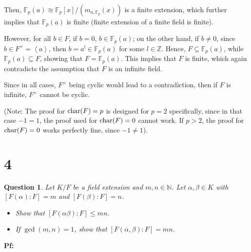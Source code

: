 \documentclass{article}
\newtheorem{question}{Question}
\begin{document}
Then, $\mathbb{F}_p(a) \cong \mathbb{F}_p[x]/(m_{a,\mathbb{F}_p}(x))$ is a finite extension, which further implies that $\mathbb{F}_p(a)$ is finite (finite extension of a finite field is finite).

However, for all $b\in F$, if $b=0$, $b\in\mathbb{F}_p(a)$; on the other hand, if $b\neq 0$, since $b\in F^\times = \left<a\right>$, then $b=a^l\in\mathbb{F}_p(a)$ for some $l\in\mathbb{Z}$. Hence, $F\subseteq\mathbb{F}_p(a)$, while $\mathbb{F}_p(a)\subseteq F$, showing that $F=\mathbb{F}_p(a)$. This implies that $F$ is finite, which again contradicts the assumption that $F$ is an infinite field.

\hfil

Since in all cases, $F^\times$ being cyclic would lead to a contradiction, then if $F$ is infinite, $F^\times$ cannot be cyclic.

(Note: The proof for $\textmd{char}(F)=p$ is designed for $p=2$ specifically, since in that case $-1=1$, the proof used for $\textmd{char}(F)=0$ cannot work. If $p>2$, the proof for $\textmd{char}(F)=0$ works perfectly fine, since $-1 \neq 1$).

\break

\section*{4}
\begin{myBox}[]{}
    \begin{question}
        Let $K/F$ be a field extension and $m,n\in\mathbb{N}$. Let $\alpha,\beta\in K$ with $[F(\alpha):F]=m$ and $[F(\beta):F]=n$.
        \begin{itemize}
            \item[(a)] Show that $[F(\alpha\beta):F]\leq mn$.
            \item[(b)] If $\gcd(m,n)=1$, show that $[F(\alpha,\beta):F]=mn$.
        \end{itemize}
    \end{question}
\end{myBox}

\textbf{Pf:}
\end{document}
